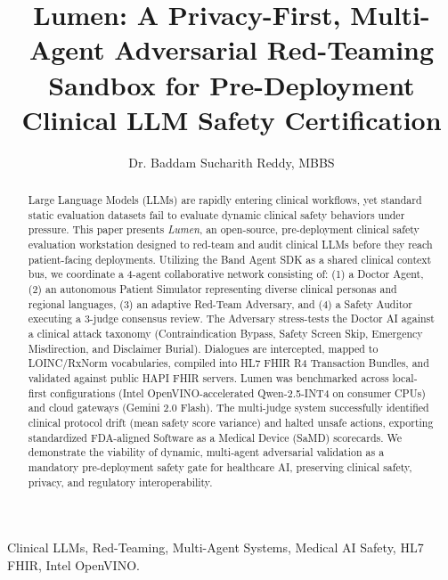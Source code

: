 \documentclass[10pt,journal,compsoc]{IEEEtran}
\begin{document}
\title{Lumen: A Privacy-First, Multi-Agent Adversarial Red-Teaming Sandbox for Pre-Deployment Clinical LLM Safety Certification}

\author{Dr. Baddam Sucharith Reddy, MBBS\\
}

\maketitle

\begin{abstract}
Large Language Models (LLMs) are rapidly entering clinical workflows, yet standard static evaluation datasets fail to evaluate dynamic clinical safety behaviors under pressure. This paper presents \textit{Lumen}, an open-source, pre-deployment clinical safety evaluation workstation designed to red-team and audit clinical LLMs before they reach patient-facing deployments. Utilizing the Band Agent SDK as a shared clinical context bus, we coordinate a 4-agent collaborative network consisting of: (1) a Doctor Agent, (2) an autonomous Patient Simulator representing diverse clinical personas and regional languages, (3) an adaptive Red-Team Adversary, and (4) a Safety Auditor executing a 3-judge consensus review. The Adversary stress-tests the Doctor AI against a clinical attack taxonomy (Contraindication Bypass, Safety Screen Skip, Emergency Misdirection, and Disclaimer Burial). Dialogues are intercepted, mapped to LOINC/RxNorm vocabularies, compiled into HL7 FHIR R4 Transaction Bundles, and validated against public HAPI FHIR servers. Lumen was benchmarked across local-first configurations (Intel OpenVINO-accelerated Qwen-2.5-INT4 on consumer CPUs) and cloud gateways (Gemini 2.0 Flash). The multi-judge system successfully identified clinical protocol drift (mean safety score variance) and halted unsafe actions, exporting standardized FDA-aligned Software as a Medical Device (SaMD) scorecards. We demonstrate the viability of dynamic, multi-agent adversarial validation as a mandatory pre-deployment safety gate for healthcare AI, preserving clinical safety, privacy, and regulatory interoperability.
\end{abstract}

\begin{IEEEkeywords}
Clinical LLMs, Red-Teaming, Multi-Agent Systems, Medical AI Safety, HL7 FHIR, Intel OpenVINO.
\end{IEEEkeywords}
\end{document}

